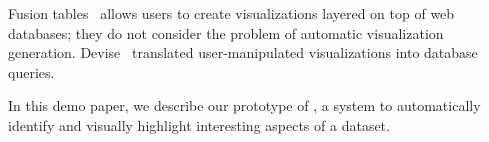Fusion tables~\cite{DBLP:conf/sigmod/GonzalezHJLMSSG10} allows users to create
visualizations layered on top of web databases; they do not consider the problem
of automatic visualization generation.
Devise~\cite{DBLP:conf/sigmod/LivnyRBCDLMW97} translated user-manipulated
visualizations into database queries.


% 
% 
% 
% 
% 

In this demo paper, we describe our prototype of \SeeDB, a system to
automatically identify and visually highlight interesting aspects of a dataset. 

